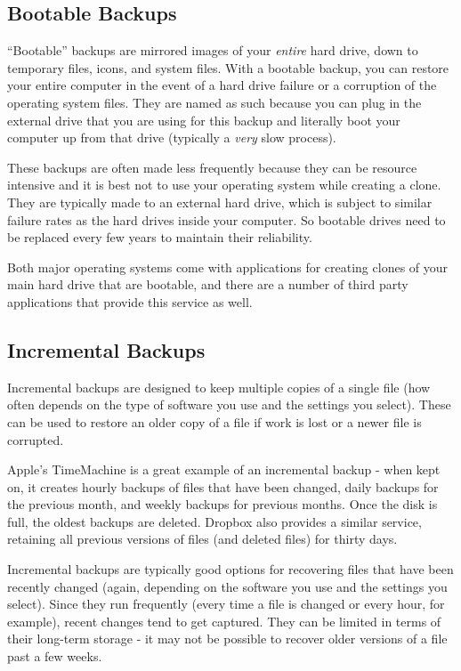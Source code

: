\documentclass[]{book}
\theoremstyle{definition}
\theoremstyle{definition}
\theoremstyle{definition}
\theoremstyle{remark}
\begin{document}
\subsection{Bootable Backups}\label{bootable-backups}

``Bootable'' backups are mirrored images of your \emph{entire} hard
drive, down to temporary files, icons, and system files. With a bootable
backup, you can restore your entire computer in the event of a hard
drive failure or a corruption of the operating system files. They are
named as such because you can plug in the external drive that you are
using for this backup and literally boot your computer up from that
drive (typically a \emph{very} slow process).

These backups are often made less frequently because they can be
resource intensive and it is best not to use your operating system while
creating a clone. They are typically made to an external hard drive,
which is subject to similar failure rates as the hard drives inside your
computer. So bootable drives need to be replaced every few years to
maintain their reliability.

Both major operating systems come with applications for creating clones
of your main hard drive that are bootable, and there are a number of
third party applications that provide this service as well.

\subsection{Incremental Backups}\label{incremental-backups}

Incremental backups are designed to keep multiple copies of a single
file (how often depends on the type of software you use and the settings
you select). These can be used to restore an older copy of a file if
work is lost or a newer file is corrupted.

Apple's TimeMachine is a great example of an incremental backup - when
kept on, it creates hourly backups of files that have been changed,
daily backups for the previous month, and weekly backups for previous
months. Once the disk is full, the oldest backups are deleted. Dropbox
also provides a similar service, retaining all previous versions of
files (and deleted files) for thirty days.

Incremental backups are typically good options for recovering files that
have been recently changed (again, depending on the software you use and
the settings you select). Since they run frequently (every time a file
is changed or every hour, for example), recent changes tend to get
captured. They can be limited in terms of their long-term storage - it
may not be possible to recover older versions of a file past a few
weeks.
\end{document}
